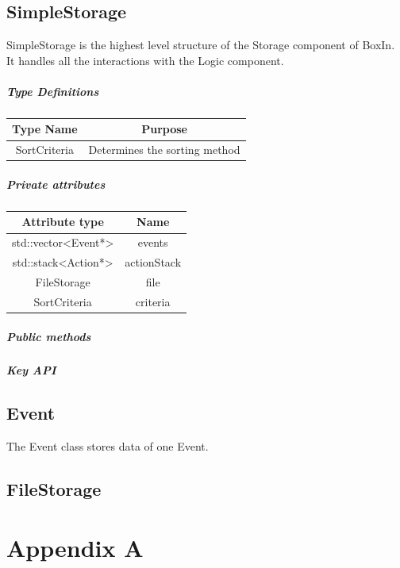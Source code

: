 \documentclass[12pt]{extarticle}
\begin{document}
\subsection{SimpleStorage}
SimpleStorage is the highest level structure of the Storage component of BoxIn. It handles all the interactions with the Logic component.
\subparagraph{Type Definitions}
\begin{tabular}{c c}
Type Name & Purpose\\
\hline
SortCriteria & Determines the sorting method\\
\end{tabular}
\subparagraph{Private attributes}
\begin{tabular}{c c}
Attribute type & Name\\
\hline
std::vector<Event*> & events\\
std::stack<Action*> & actionStack\\
FileStorage & file\\
SortCriteria & criteria \\
\end{tabular}
\subparagraph{Public methods}
\subparagraph{Key API}

\subsection{Event}	 					
The Event class stores data of one Event.
\subsection{FileStorage}


\newpage

\section{Appendix A}
\end{document}
